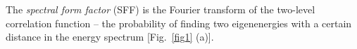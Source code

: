 \documentclass[aps,prx,reprint,twocolumn,superscriptaddress,floatfix,nofootinbib]{revtex4-2}
\begin{document}

The \textit{spectral form factor} (SFF) is the Fourier transform of the two-level correlation function -- the probability of finding two eigenenergies with a certain distance in the energy spectrum [Fig.~\ref{fig1} (a)].
\end{document}
